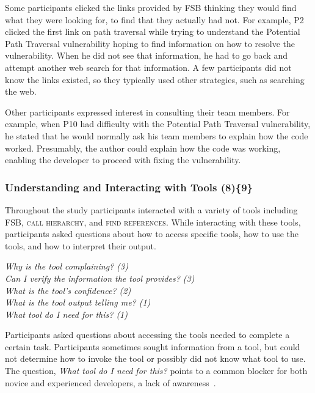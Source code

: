 \documentclass{acm_proc_article-sp}
\begin{document}
Some participants clicked the links provided by FSB thinking they would find what they were looking for, to find that they actually had not. 
For example, P2 clicked the first link on path traversal while trying to understand the Potential Path Traversal vulnerability hoping to find information on how to resolve the vulnerability.
When he did not see that information, he had to go back and attempt another web search for that information. 
A few participants did not know the links existed, so they typically used other strategies, such as searching the web.

Other participants expressed interest in consulting their team members. 
For example, when P10 had difficulty with the Potential Path Traversal vulnerability, he stated that he would normally ask his team members to explain how the code worked.
Presumably, the author could explain how the code was working, enabling the developer to proceed with fixing the vulnerability.



\subsubsection{\textbf{Understanding and Interacting with Tools (8)\{9\}}}\label{uit}

Throughout the study participants interacted with a variety of tools including FSB, \textsc{call hierarchy}, and \textsc{find references}. 
While interacting with these tools, participants asked questions about how to access specific tools, how to use the tools, and how to interpret their output. 


\noindent\emph{Why is the tool complaining? (3)} \\
\emph{Can I verify the information the tool provides? (3)} \\
\emph{What is the tool's confidence? (2)} \\
\emph{What is the tool output telling me? (1)} \\
\emph{What tool do I need for this? (1)} 

Participants asked questions about accessing the tools needed to complete a certain task.
Participants sometimes sought information from a tool, but could not determine how to invoke the tool or possibly did not know what tool to use. 
The question, \emph{What tool do I need for this?} points to a common blocker for both novice and experienced developers, a lack of awareness~\cite{murphy-Hill2012fluency}.
\end{document}
